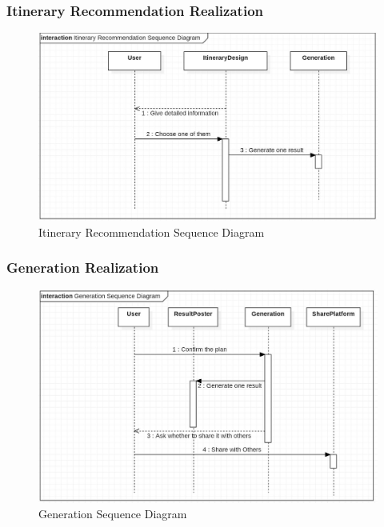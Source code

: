 \documentclass[10pt]{article}
\begin{document}
\subsubsection{Itinerary Recommendation Realization}

\begin{figure}[H]
    \centering
    
    \includegraphics[width=14cm]{itinerary.jpg}
    \caption{Itinerary Recommendation Sequence Diagram}
    \label{Itinerary Recommendation Sequence Diagram}
\end{figure}

\subsubsection{Generation Realization}
\begin{figure}[H]
    \centering
    
    \includegraphics[width=14cm]{generation.jpg}
    \caption{Generation Sequence Diagram}
    \label{Generation Sequence Diagram}
\end{figure}
\end{document}

